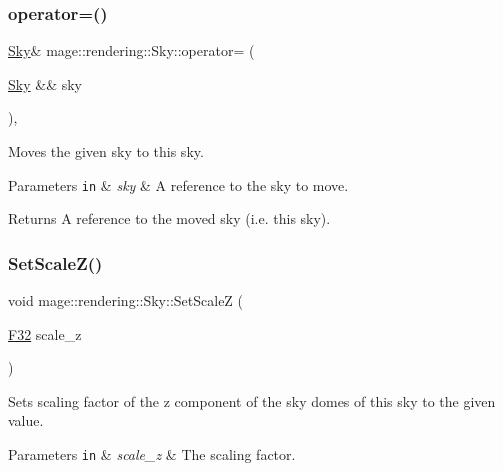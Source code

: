 \subsubsection{\texorpdfstring{operator=()}{operator=()}\hspace{0.1cm}{\footnotesize\ttfamily [2/2]}}
{\footnotesize\ttfamily \mbox{\hyperlink{classmage_1_1rendering_1_1_sky}{Sky}}\& mage\+::rendering\+::\+Sky\+::operator= (\begin{DoxyParamCaption}\item[{\mbox{\hyperlink{classmage_1_1rendering_1_1_sky}{Sky}} \&\&}]{sky }\end{DoxyParamCaption})\hspace{0.3cm}{\ttfamily [default]}, {\ttfamily [noexcept]}}

Moves the given sky to this sky.


\begin{DoxyParams}[1]{Parameters}
\mbox{\tt in}  & {\em sky} & A reference to the sky to move. \\
\hline
\end{DoxyParams}
\begin{DoxyReturn}{Returns}
A reference to the moved sky (i.\+e. this sky). 
\end{DoxyReturn}
\mbox{\label{classmage_1_1rendering_1_1_sky_a92fcaf3c89a39fd97a37ab61adf1c194}} 
\subsubsection{\texorpdfstring{Set\+Scale\+Z()}{SetScaleZ()}}
{\footnotesize\ttfamily void mage\+::rendering\+::\+Sky\+::\+Set\+ScaleZ (\begin{DoxyParamCaption}\item[{\mbox{\hyperlink{namespacemage_aa97e833b45f06d60a0a9c4fc22ae02c0}{F32}}}]{scale\+\_\+z }\end{DoxyParamCaption})\hspace{0.3cm}{\ttfamily [noexcept]}}

Sets scaling factor of the z component of the sky domes of this sky to the given value.


\begin{DoxyParams}[1]{Parameters}
\mbox{\tt in}  & {\em scale\+\_\+z} & The scaling factor. \\
\hline
\end{DoxyParams}
\mbox{\label{classmage_1_1rendering_1_1_sky_aca571c68ad345801051fcc36e32013e6}} 

